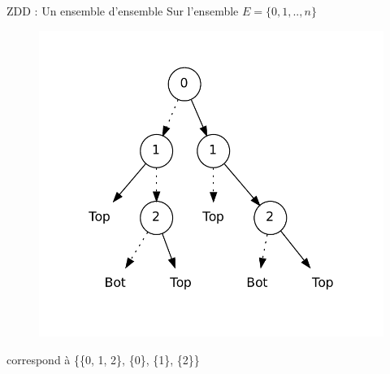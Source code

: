 \documentclass{beamer}
\begin{document}
\begin{frame}{ZDD : Un ensemble d'ensemble}
Sur l'ensemble $E = \{0, 1,..,n\}$
\begin{figure}[htp]
\begin{center}
\includegraphics[scale=0.3]{../imports/zdd_ex.pdf}
\end{center}
\end{figure}
correspond à \{\{0, 1, 2\}, \{0\}, \{1\}, \{2\}\}
\end{frame}
\end{document}
